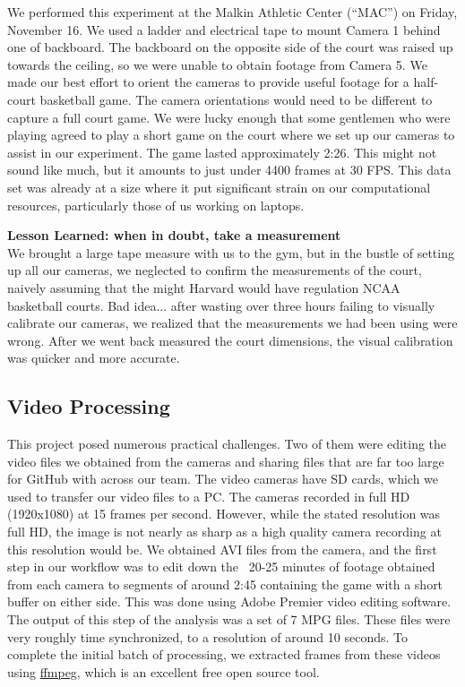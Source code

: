 \documentclass{article}
\begin{document}
We performed this experiment at the Malkin Athletic Center (``MAC'') on Friday, November 16.  
We used a ladder and electrical tape to mount Camera 1 behind one of backboard.
The backboard on the opposite side of the court was raised up towards the ceiling,
so we were unable to obtain footage from Camera 5.
We made our best effort to orient the cameras to provide useful footage for a half-court basketball game.  
The camera orientations would need to be different to capture a full court game.
We were lucky enough that some gentlemen who were playing agreed to play
a short game on the court where we set up our cameras to assist in our experiment.
The game lasted approximately 2:26.  This might not sound like much, but it amounts to just under 4400 frames at 30 FPS.
This data set was already at a size where it put significant strain on our computational resources,
particularly those of us working on laptops.

\textbf{Lesson Learned: when in doubt, take a measurement}\\
We brought a large tape measure with us to the gym, but in the bustle of setting up 
all our cameras, we neglected to confirm the measurements of the court,
naively assuming that the might Harvard would have regulation NCAA basketball courts.
Bad idea... after wasting over three hours failing to visually calibrate our cameras,
we realized that the measurements we had been using were wrong.
After we went back measured the court dimensions, the visual calibration
was quicker and more accurate.

\subsection{Video Processing}
This project posed numerous practical challenges.  
Two of them were editing the video files we obtained from the cameras 
and sharing files that are far too large for GitHub with across our team.
The video cameras have SD cards, which we used to transfer our video files to a PC.
The cameras recorded in full HD (1920x1080) at 15 frames per second.
However, while the stated resolution was full HD, the image is not nearly as sharp
as a high quality camera recording at this resolution would be.
We obtained AVI files from the camera, and the first step in our workflow was to 
edit down the ~20-25 minutes of footage obtained from each camera to segments
of around 2:45 containing the game with a short buffer on either side. 
This was done using Adobe Premier video editing software.
The output of this step of the analysis was a set of 7 MPG files.
These files were very roughly time synchronized, to a resolution of around 10 seconds.
To complete the initial batch of processing, we extracted frames from these videos
using \href{https://www.ffmpeg.org/}{ffmpeg}, which is an excellent free open source tool.
\end{document}
